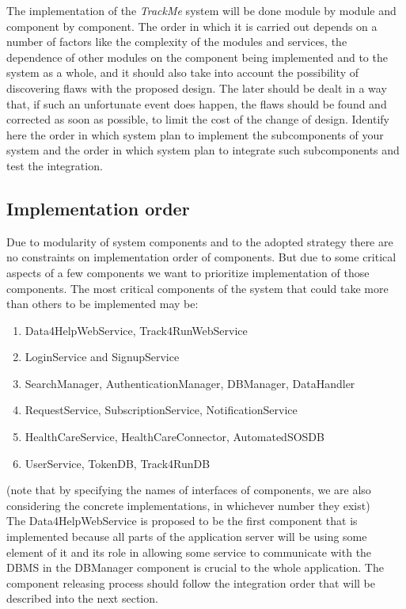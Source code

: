 \documentclass[a4paper, hidelinks, 12pt]{report}
\begin{document}
The implementation of the \textit{TrackMe} system will be done module by module and component by component. The order in which it is carried out depends on a number of factors like the complexity of the modules and services, the dependence of other modules on the component being implemented and to the system as a whole, and it should also take into account the possibility of discovering flaws with the proposed design. The later should be dealt in a way that, if such an unfortunate event does	happen, the flaws should be found and corrected as soon as possible, to limit the cost of the change of design. Identify here the order in which system plan to implement the subcomponents of your system and the order in which system plan to integrate such subcomponents and test the integration.\\

\subsection{Implementation order}
Due to modularity of system components and to the adopted strategy there are no constraints on implementation order of components. But due to some critical aspects of a few components we want to prioritize implementation of those components.
The most critical components of the system that could take more than others to be implemented may be:

\begin{enumerate}
\item{} Data4HelpWebService, Track4RunWebService
\item{} LoginService and SignupService
\item{} SearchManager, AuthenticationManager, DBManager, DataHandler
\item{} RequestService, SubscriptionService, NotificationService
\item{} HealthCareService, HealthCareConnector, AutomatedSOSDB
\item{} UserService, TokenDB, Track4RunDB
\end{enumerate}
(note that by specifying the names of interfaces of components, we are also considering the concrete implementations, in whichever number they exist)\\

The Data4HelpWebService is proposed to be the first component that is implemented because all parts of the application server will be using some element of it and its role in allowing some service to communicate with the DBMS in the DBManager component is crucial to the whole application. The component releasing process should follow the integration order that will be described into the next section.
\end{document}
